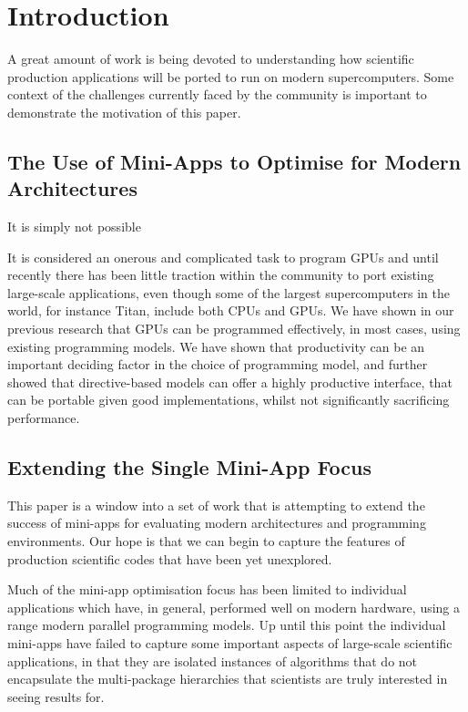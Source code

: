 \documentclass[runningheads,a4paper]{llncs}
\begin{document}
\section{Introduction}

A great amount of work is being devoted to understanding how scientific production applications will be ported to run on modern supercomputers. Some context of the challenges currently faced by the community is important to demonstrate the motivation of this paper. 

\subsection{The Use of Mini-Apps to Optimise for Modern Architectures}

It is simply not possible 

It is considered an onerous and complicated task to program GPUs and until recently there has been little traction within the community to port existing large-scale applications, even though some of the largest supercomputers in the world, for instance Titan, include both CPUs and GPUs. We have shown in our previous research that GPUs can be programmed effectively, in most cases, using existing programming models. We have shown that productivity can be an important deciding factor in the choice of programming model, and further showed that directive-based models can offer a highly productive interface, that can be portable given good implementations, whilst not significantly sacrificing performance.

\subsection{Extending the Single Mini-App Focus}

This paper is a window into a set of work that is attempting to extend the success of mini-apps for evaluating modern architectures and programming environments. Our hope is that we can begin to capture the features of production scientific codes that have been yet unexplored. 


Much of the mini-app optimisation focus has been limited to individual applications which have, in general, performed well on modern hardware, using a range modern parallel programming models. Up until this point the individual mini-apps have failed to capture some important aspects of large-scale scientific applications, in that they are isolated instances of algorithms that do not encapsulate the multi-package hierarchies that scientists are truly interested in seeing results for.
\end{document}
